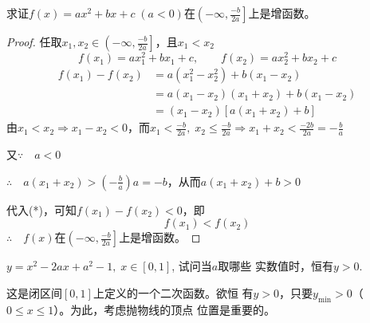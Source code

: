 \begin{example}
求证$f(x)=ax^2+bx+c\; (a<0)$在$\left(-\infty, \frac{-b}{2a}\right]$上是增函数。
\end{example}

\begin{proof}
任取$x_1,x_2\in \left(-\infty, \frac{-b}{2a}\right]$，且$x_1<x_2$
\[f(x_1)=ax_1^2+bx_1+c,\qquad f(x_2)=ax_2^2+bx_2+c\]
\begin{align*}
    f(x_1)-f(x_2)&=a(x_1^2-x_2^2)+b(x_1-x_2)\\
    &=a(x_1-x_2)(x_1+x_2)+b(x_1-x_2)\\
    &=(x_1-x_2)[a(x_1+x_2)+b] \tag{*}
\end{align*}
由$x_1<x_2\Longrightarrow x_1-x_2<0$，而$x_1<\frac{-b}{2a},\; x_2\le \frac{-b}{2a}\Longrightarrow x_1+x_2<\frac{-2b}{2a}=-\frac{b}{a}$

又$\because\quad a<0$

$\therefore\quad a(x_1+x_2)>\left(-\frac{b}{a}\right)a=-b$，从而$a(x_1+x_2)+b>0$

代入(*)，可知$f(x_1)-f(x_2)<0$，即
\[f(x_1)<f(x_2)\]
$\therefore\quad f(x)$在$\left(-\infty, \frac{-b}{2a}\right]$上是增函数。
\end{proof}

\begin{example}
$y=x^2-2ax+a^2-1,\; x\in [0,1]$, 试问当$a$取哪些
实数值时，恒有$y>0$.
\end{example}

\begin{analyze}
    这是闭区间$[0,1]$上定义的一个二次函数。欲恒
有$y>0$，只要$y_{\min}>0$（$0\le x\le 1$）。为此，考虑抛物线的顶点
位置是重要的。
\end{analyze}

